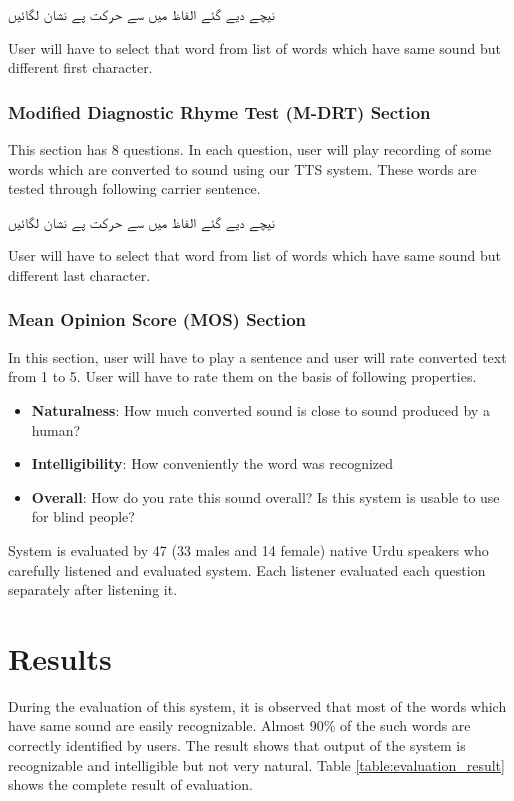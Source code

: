   \texturdu{نیچے دیے گئے الفاظ میں سے حرکت پے نشان لگائیں}

User will have to select that word from list of words which have same sound but different first character.

\subsubsection{Modified Diagnostic Rhyme Test (M-DRT) Section}

This section has 8 questions. In each question, user will play recording of some words which are converted to sound using our TTS system. These words are tested through following carrier sentence.

  \texturdu{نیچے دیے گئے الفاظ میں سے حرکت پے نشان لگائیں}

User will have to select that word from list of words which have same sound but different last character.

\subsubsection{Mean Opinion Score (MOS) Section}
In this section, user will have to play a sentence and user will rate converted text from 1 to 5. User will have to rate them on the basis of following properties.

\begin{itemize}
  \item {\textbf{Naturalness}:} How much converted sound is close to sound produced by a human? 
  \item {\textbf{Intelligibility}:} How conveniently the word was recognized
  \item {\textbf{Overall}:} How do you rate this sound overall? Is this system is usable to use for blind people?
\end{itemize}

System is evaluated by 47 (33 males and 14 female) native Urdu speakers who carefully listened and evaluated system. Each listener evaluated each question separately after listening it.

\section{Results}

During the evaluation of this system, it is observed that most of the words which have same sound are easily recognizable. Almost 90\% of the such words are correctly identified by users. The result shows that output of the system is recognizable and intelligible but not very natural. Table \ref{table:evaluation_result} shows the complete result of evaluation.

